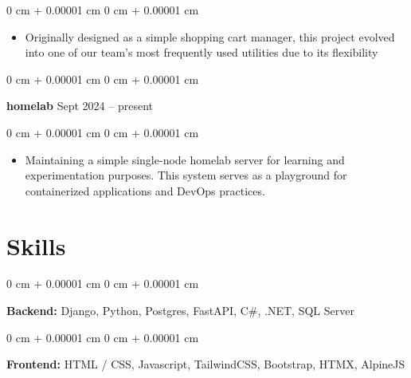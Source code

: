 \documentclass[10pt, letterpaper]{article}
\newenvironment{highlights}{
    \begin{itemize}[
        topsep=0.10 cm,
        parsep=0.10 cm,
        partopsep=0pt,
        itemsep=0pt,
        leftmargin=0 cm + 10pt
    ]
}{
    \end{itemize}
} %
\newenvironment{onecolentry}{
    \begin{adjustwidth}{
        0 cm + 0.00001 cm
    }{
        0 cm + 0.00001 cm
    }
}{
    \end{adjustwidth}
} %
\newenvironment{twocolentry}[2][]{
    \onecolentry
    \def\secondColumn{#2}
    \setcolumnwidth{\fill, 4.5 cm}
    \begin{paracol}{2}
}{
    \switchcolumn \raggedleft \secondColumn
    \end{paracol}
    \endonecolentry
} %
\begin{document}
        \vspace{0.10 cm}
        \begin{onecolentry}
            \begin{highlights}
                \item Originally designed as a simple shopping cart manager, this project evolved into one of our team's most frequently used utilities due to its flexibility
            \end{highlights}
        \end{onecolentry}


        \vspace{0.2 cm}

        \begin{twocolentry}{
            Sept 2024 – present
        }
            \textbf{homelab}\end{twocolentry}

        \vspace{0.10 cm}
        \begin{onecolentry}
            \begin{highlights}
                \item Maintaining a simple single-node homelab server for learning and experimentation purposes. This system serves as a playground for containerized applications and DevOps practices.
            \end{highlights}
        \end{onecolentry}



    
    \section{Skills}



        
        \begin{onecolentry}
            \textbf{Backend:} Django, Python, Postgres, FastAPI, C\#, .NET, SQL Server
        \end{onecolentry}

        \vspace{0.2 cm}

        \begin{onecolentry}
            \textbf{Frontend:} HTML / CSS, Javascript, TailwindCSS, Bootstrap, HTMX, AlpineJS
        \end{onecolentry}

        \vspace{0.2 cm}
\end{document}
